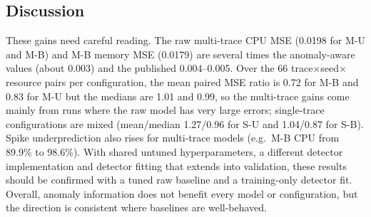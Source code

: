 \documentclass[conference]{IEEEtran}
\begin{document}
\subsection{Discussion}\label{discussion}

These gains need careful reading. The raw multi-trace CPU MSE (0.0198 for M-U and
M-B) and M-B memory MSE (0.0179) are several times the anomaly-aware values
(about 0.003) and the published 0.004--0.005. Over the 66
trace$\times$seed$\times$resource pairs per configuration, the mean paired MSE
ratio is 0.72 for M-B and 0.83 for M-U but the medians are 1.01 and 0.99, so the
multi-trace gains come mainly from runs where the raw model has very large
errors; single-trace configurations are mixed (mean/median 1.27/0.96 for S-U and
1.04/0.87 for S-B). Spike underprediction also rises for multi-trace models
(e.g.\ M-B CPU from 89.9\% to 98.6\%). With shared untuned hyperparameters, a
different detector implementation and detector fitting that extends into
validation, these results should be confirmed with a tuned raw baseline and a
training-only detector fit. Overall, anomaly information does not benefit every
model or configuration, but the direction is consistent where baselines are
well-behaved.

\begin{table}[!t]
\caption{HBNN with and without anomaly-aware inputs, mean over eleven traces
and three seeds. R: raw; A: anomaly-aware; S: spike; SUP: spike underprediction (\%).}
\label{tab:hbnn}
\centering
\scriptsize
\setlength{\tabcolsep}{2.5pt}
\end{table}
\end{document}
